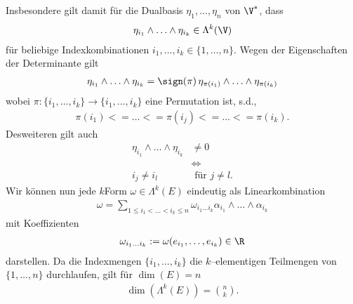 \documentclass[letterpaper,10pt,english]{jupyterBook}
\begin{document}
\sphinxAtStartPar
Insbesondere gilt damit für die Dualbasis \(\eta_1,\ldots,\eta_n\) von \(\V^*\), dass
\begin{equation*}
\begin{split}\eta_{i_1}\wedge\ldots\wedge\eta_{i_k}\in\Lambda^k(\V)\end{split}
\end{equation*}
\sphinxAtStartPar
für beliebige Indexkombinationen \(i_1,\ldots,i_k \in \{1,\ldots,n \}\). Wegen der Eigenschaften der Determinante gilt
\begin{equation*}
\begin{split}\eta_{i_1}\wedge\ldots\wedge\eta_{i_k} = \sign(\pi)\, \eta_{\pi(i_1)}\wedge\ldots\wedge\eta_{\pi(i_k)} \end{split}
\end{equation*}
\sphinxAtStartPar
wobei \(\pi:\{i_1,\ldots,i_k\}\rightarrow\{i_1,\ldots,i_k\}\) eine Permutation ist, s.d.,
\begin{equation*}
\begin{split}\pi(i_1) <= \ldots <= \pi(i_j) <= \ldots <= \pi(i_k).\end{split}
\end{equation*}
\sphinxAtStartPar
Desweiteren gilt auch
\begin{equation*}
\begin{split}\eta_{i_1}\wedge\ldots\wedge\eta_{i_k} &\neq 0\\
&\Leftrightarrow \\
i_{j}\neq i_l&\text{ für } j\neq l.\end{split}
\end{equation*}
\sphinxAtStartPar
Wir können nun jede \(k\)\sphinxhyphen{}Form \(\omega\in\Lambda^k(E)\) eindeutig als Linearkombination
\begin{equation*}
\begin{split}\omega = \sum_{1\leq i_1<\ldots<i_k\leq n}\omega_{i_1\ldots i_k}
\alpha_{i_1}\wedge\ldots\wedge\alpha_{i_k}\end{split}
\end{equation*}
\sphinxAtStartPar
mit Koeffizienten
\begin{equation*}
\begin{split}\omega_{i_1\ldots i_k} := \omega(e_{i_1},\ldots,e_{i_k})\in\R\end{split}
\end{equation*}
\sphinxAtStartPar
darstellen. Da
die Indexmengen \(\{i_1,\ldots ,i_k\}\) die \(k\)–elementigen Teilmengen von\(\{1,\ldots,n\}\) durchlaufen, gilt
für \(\dim(E)=n\)
\begin{equation*}
\begin{split}\dim\left(\Lambda^k(E)\right) = {n\choose k}.\end{split}
\end{equation*}
\end{document}
